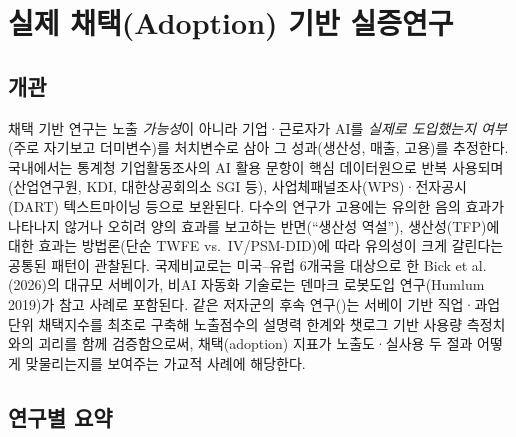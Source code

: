 \documentclass[11pt]{article}
\begin{document}
\section{실제 채택(Adoption) 기반 실증연구}
\label{sec:adoption}

\subsection{개관}

채택 기반 연구는 노출 \emph{가능성}이 아니라 기업·근로자가 AI를 \emph{실제로 도입했는지 여부}(주로 자기보고 더미변수)를 처치변수로 삼아 그 성과(생산성, 매출, 고용)를 추정한다. 국내에서는 통계청 기업활동조사의 AI 활용 문항이 핵심 데이터원으로 반복 사용되며(산업연구원, KDI, 대한상공회의소 SGI 등), 사업체패널조사(WPS)·전자공시(DART) 텍스트마이닝 등으로 보완된다. 다수의 연구가 고용에는 유의한 음의 효과가 나타나지 않거나 오히려 양의 효과를 보고하는 반면(``생산성 역설''), 생산성(TFP)에 대한 효과는 방법론(단순 TWFE vs.\ IV/PSM-DID)에 따라 유의성이 크게 갈린다는 공통된 패턴이 관찰된다. 국제비교로는 미국--유럽 6개국을 대상으로 한 Bick et al.(2026)의 대규모 서베이가, 비AI 자동화 기술로는 덴마크 로봇도입 연구(Humlum 2019)가 참고 사례로 포함된다. 같은 저자군의 후속 연구(\citealp{bick-2026-what-work-does-generative})는 서베이 기반 직업·과업단위 채택지수를 최초로 구축해 노출점수의 설명력 한계와 챗로그 기반 사용량 측정치와의 괴리를 함께 검증함으로써, 채택(adoption) 지표가 노출도·실사용 두 절과 어떻게 맞물리는지를 보여주는 가교적 사례에 해당한다.

\subsection{연구별 요약}
\end{document}
